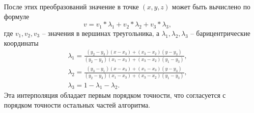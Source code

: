 После этих преобразований значение в точке $(x,y,z)$ может быть вычислено по формуле
\begin{equation}
\label{eq:triangle_interpolation}
v=v_1*\lambda_1+v_2*\lambda_2+v_3*\lambda_3, 
\end{equation}
где $v_1,v_2,v_3$ -- значения в вершинах треугольника, а $\lambda_1,\lambda_2,\lambda_3$ -- барицентрические координаты
\begin{eqnarray}
\label{eq:barycentric_coords}
\lambda_1=\frac{(y_2-y_3)(x-x_3)+(x_3-x_2)(y-y_3)}{(y_2-y_3)(x_1-x_3)+(x_3-x_2)(y_1-y_3)}, \nonumber \\
\lambda_2=\frac{(y_3-y_1)(x-x_3)+(x_1-x_3)(y-y_3)}{(y_2-y_3)(x_1-x_3)+(x_3-x_2)(y_1-y_3)}, \nonumber \\
\lambda_3=1-\lambda_1-\lambda_2.
\end{eqnarray}
Эта интерполяция обладает первым порядком точности, что согласуется с порядком точности остальных частей алгоритма.
